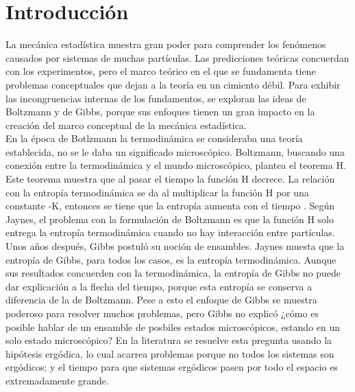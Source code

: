 \chapter{Introducción} 

La mecánica estadística muestra gran poder para comprender los fenómenos causados por sistemas de muchas partículas. Las predicciones teóricas concuerdan con los experimentos, pero el marco teórico en el que se fundamenta tiene problemas conceptuales que dejan a la teoría en un cimiento débil.  Para exhibir las incongruencias internas de los fundamentos, se exploran las ideas de Boltzmann y de Gibbs, porque sus enfoques tienen un gran impacto en la creación del marco conceptual de la mecánica estadística.
\\ 
En la época de Botlzmann la termodinámica se consideraba una teoría establecida, no se le daba un significado microscópico. Boltzmann, buscando una conexión entre la termodinámica y  el mundo microscópico, plantea el teorema H. Este teorema muestra que al pasar el tiempo la función H decrece. La relación con la entropía termodinámica se da al multiplicar la función H por una constante -K, entonces se tiene que la entropía aumenta con el tiempo \cite{Ehrenfest}. Según Jaynes, el problema con la formulación de Boltzmann es que la función H solo entrega la entropía termodinámica  cuando no hay interacción entre partículas.
\\
Unos años después, Gibbs postuló su noción de ensambles. Jaynes muesta que la entropía de Gibbs, para todos los casos, es la entropía termodinámica. Aunque sus resultados concuerden con la termodinámica, la entropía de Gibbs no puede dar explicación a la flecha del tiempo, porque esta entropía se conserva a diferencia de la de Boltzmann. Pese a esto el enfoque de Gibbs se muestra poderoso para resolver muchos problemas, pero Gibbs no explicó ¿cómo es posible hablar de un ensamble de posbiles estados microscópicos, estando en un solo estado microscópico? En la literatura se resuelve esta pregunta usando la hipótesis ergódica, lo cual acarrea problemas porque no todos los sistemas son ergódicos; y el tiempo para que sistemas ergódicos pasen por todo el espacio es extremadamente grande. 

